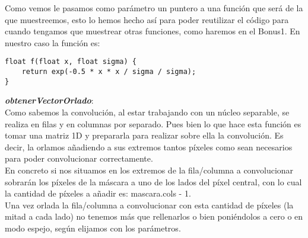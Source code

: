 \documentclass[10pt,a4paper]{article}
\begin{document}
Como vemos le pasamos como parámetro un puntero a una función que será de la que muestreemos, esto lo hemos hecho así para poder reutilizar el código para cuando tengamos que muestrear otras funciones, como haremos en el Bonus1. En nuestro caso la función es:

\begin{lstlisting}
float f(float x, float sigma) {
	return exp(-0.5 * x * x / sigma / sigma);
}
\end{lstlisting}

\textbf{\textit{obtenerVectorOrlado}}:\\

Como sabemos la convolución, al estar trabajando con un núcleo separable, se realiza en filas y en columnas por separado. Pues bien lo que hace esta función es tomar una matriz 1D y prepararla para realizar sobre ella la convolución. Es decir, la orlamos añadiendo a sus extremos tantos píxeles como sean necesarios para poder convolucionar correctamente.\\

En concreto si nos situamos en los extremos de la fila/columna a convolucionar sobrarán los píxeles de la máscara a uno de los lados del píxel central, con lo cual la cantidad de píxeles a añadir es: mascara.cols - 1.\\

Una vez orlada la fila/columna a convolucionar con esta cantidad de píxeles (la mitad a cada lado) no tenemos más que rellenarlos o bien poniéndolos a cero o en modo espejo, según elijamos con los parámetros.\\
\end{document}
